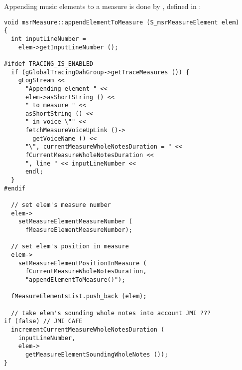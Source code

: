 Appending music elements to a measure is done by , defined in :%
\begin{lstlisting}[language=CPlusPlus]
void msrMeasure::appendElementToMeasure (S_msrMeasureElement elem)
{
  int inputLineNumber =
    elem->getInputLineNumber ();

#ifdef TRACING_IS_ENABLED
  if (gGlobalTracingOahGroup->getTraceMeasures ()) {
    gLogStream <<
      "Appending element " <<
      elem->asShortString () <<
      " to measure " <<
      asShortString () <<
      " in voice \"" <<
      fetchMeasureVoiceUpLink ()->
        getVoiceName () <<
      "\", currentMeasureWholeNotesDuration = " <<
      fCurrentMeasureWholeNotesDuration <<
      ", line " << inputLineNumber <<
      endl;
  }
#endif

  // set elem's measure number
  elem->
    setMeasureElementMeasureNumber (
      fMeasureElementMeasureNumber);

  // set elem's position in measure
  elem->
    setMeasureElementPositionInMeasure (
      fCurrentMeasureWholeNotesDuration,
      "appendElementToMeasure()");

  fMeasureElementsList.push_back (elem);

  // take elem's sounding whole notes into account JMI ???
if (false) // JMI CAFE
  incrementCurrentMeasureWholeNotesDuration (
    inputLineNumber,
    elem->
      getMeasureElementSoundingWholeNotes ());
}
\end{lstlisting}

